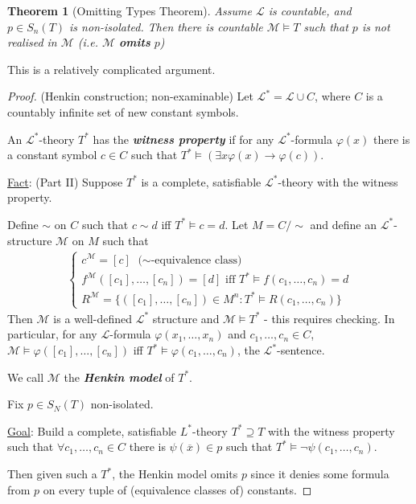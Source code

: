 \documentclass[]{article}
\theoremstyle{custhm}
\theoremstyle{cusdef}
\theoremstyle{custhm}
\theoremstyle{custhm}
\theoremstyle{custhm}
\theoremstyle{ex}
\theoremstyle{custhm}
\newtheorem*{theorem*}{Theorem}
\theoremstyle{cusdef}
\theoremstyle{remark}
\theoremstyle{remark}
\newcommand{\ra}{\rightarrow}
\newcommand{\undf}[1]{\textit{\textbf{#1}}}
\renewcommand{\L}{\mathcal{L}}
\renewcommand{\it}[1]{\textit{#1}}
\newcommand{\M}{\mathcal{M}}
\renewcommand{\phi}{\varphi}
\renewcommand{\bar}{\overline}
\begin{document}
\begin{theorem*}[Omitting Types Theorem]
Assume $\L$ is countable, and $p \in S_n(T)$ is non-isolated. Then there is countable $\M\models T$ such that $p$ is not realised in $\M$ (\it{i.e.} $\M$ \undf{omits} $p$)
\end{theorem*}

This is a relatively complicated argument.

\begin{proof} (Henkin construction; non-examinable)
Let $\L^\ast = \L\cup C$, where $C$ is a countably infinite set of new constant symbols.

An $\L^\ast$-theory $T^\ast$ has the \undf{witness property} if for any $\L^\ast$-formula $\phi(x)$ there is a constant symbol $c\in C$ such that $T^\ast \models(\exists x\phi(x)\ra \phi(c))$.

\underline{Fact}: (Part II) Suppose $T^\ast$ is a complete, satisfiable $\L^\ast$-theory with the witness property.

Define $\sim$ on $C$ such that $c\sim d$ iff $T^\ast \models c = d$. Let $M = C/\sim$ and define an $\L^\ast$-structure $\M$ on $M$ such that
\begin{align*}
	\left\lbrace \begin{array}{ll} c^\M = [c] \textrm{ ($\sim$-equivalence class)} \\ f^\M([c_1],\dots,[c_n]) = [d] \textrm{ iff } T^\ast \models f(c_1,\dots,c_n) = d\\
	R^\M = \{([c_1],\dots,[c_n])\in M^n:T^\ast\models R(c_1,\dots,c_n)\} \end{array}\right.
\end{align*}
Then $\M$ is a well-defined $\L^\ast$ structure and $\M\models T^\ast$ - this requires checking. In particular, for any $\L$-formula $\phi(x_1,\dots,x_n)$ and $c_1,\dots,c_n\in C$, $\M\models \phi([c_1],\dots,[c_n])$ iff $T^\ast\models \phi(c_1,\dots,c_n)$, the $\L^\ast$-sentence.

We call $\M$ the \undf{Henkin model} of $T^\ast$.

Fix $p \in S_N(T)$ non-isolated.

\underline{Goal}: Build a complete, satisfiable $L^\ast$-theory $T^\ast\supseteq T$ with the witness property such that $\forall c_1,\dots,c_n\in C$ there is $\psi(\bar{x})\in p$ such that $T^\ast\models \neg\psi(c_1,\dots,c_n)$.

Then given such a $T^\ast$, the Henkin model omits $p$ since it denies some formula from $p$ on every tuple of (equivalence classes of) constants.


\end{proof}
\end{document}
